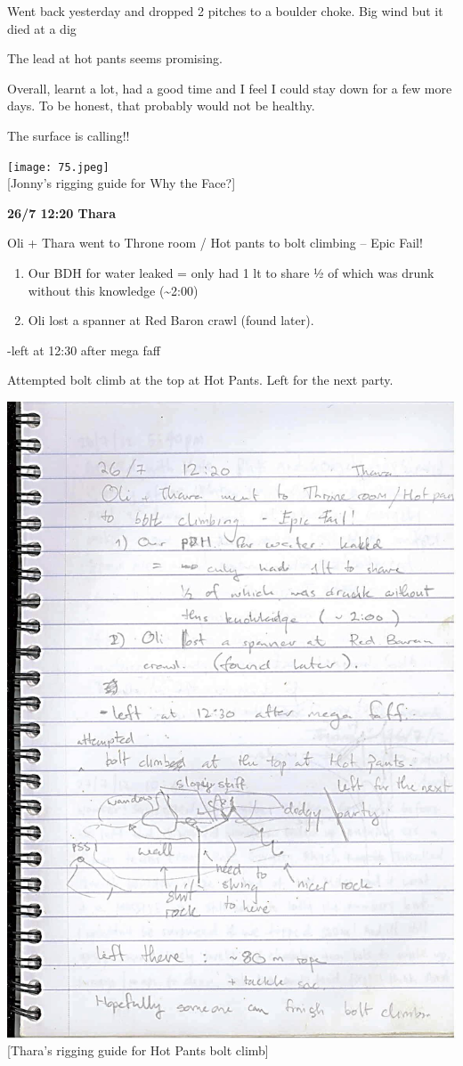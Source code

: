 Went back yesterday and dropped 2 pitches to a boulder choke. Big wind
but it died at a dig

The lead at hot pants seems promising.

Overall, learnt a lot, had a good time and I feel I could stay down for
a few more days. To be honest, that probably would not be healthy.

The surface is calling!!

\texttt{[image: 75.jpeg]}\\
{[}Jonny's rigging guide for Why the Face?{]}

\textbf{26/7 12:20 Thara}

Oli + Thara went to Throne room / Hot pants to bolt climbing -- Epic
Fail!

\begin{enumerate}
\def\labelenumi{\arabic{enumi}.}
\tightlist
\item
  Our BDH for water leaked = only had 1 lt to share ½ of which was drunk
  without this knowledge (\textasciitilde{}2:00)
\item
  Oli lost a spanner at Red Baron crawl (found later).
\end{enumerate}

-left at 12:30 after mega faff

Attempted bolt climb at the top at Hot Pants. Left for the next party.

\includegraphics{UgLog1012/76.jpeg}\\
{[}Thara's rigging guide for Hot Pants bolt climb{]}

